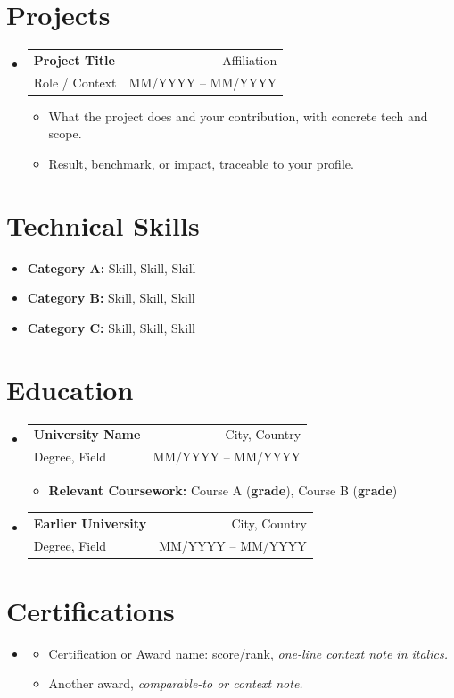 \documentclass[a4paper,10pt]{article}
\makeatletter
\newcommand{\cvitem}[1]{
  \item\small{
    {#1\vspace{-2pt}}
  }
}
\newcommand{\cvheading}[4]{
  \vspace{-2pt}\item
    \begin{tabular*}{\textwidth}[t]{l@{\extracolsep{\fill}}r}
      \textbf{#1} & #2 \\
      \small#3 & \small #4 \\
    \end{tabular*}\vspace{-6pt}
}
\newcommand{\cvheadingstart}{\begin{itemize}[leftmargin=0in, label={}]}
\newcommand{\cvheadingend}{\end{itemize}}
\newcommand{\cvitemstart}{\begin{itemize}\justifying}
\newcommand{\cvitemend}{\end{itemize}\vspace{-3pt}}
\makeatother
\begin{document}
\section{Projects}
\cvheadingstart
  \cvheading
    {Project Title}{Affiliation}
    {Role / Context}{MM/YYYY -- MM/YYYY}
  \cvitemstart
    \cvitem{What the project does and your contribution, with concrete tech and scope.}
    \cvitem{Result, benchmark, or impact, traceable to your profile.}
  \cvitemend
\cvheadingend

\section{Technical Skills}
    \cvitemstart
        \cvitem{{\bfseries Category A:} Skill, Skill, Skill}
        \cvitem{{\bfseries Category B:} Skill, Skill, Skill}
        \cvitem{{\bfseries Category C:} Skill, Skill, Skill}
    \cvitemend
\vspace{-5pt}

\section{Education}
\cvheadingstart
  \cvheading
    {University Name}{City, Country}
    {Degree, Field}{MM/YYYY -- MM/YYYY}
        \cvitemstart
        \cvitem{{\bfseries Relevant Coursework:}  Course A (\textbf{grade}), Course B (\textbf{grade})}
    \cvitemend
  \cvheading
    {Earlier University}{City, Country}
    {Degree, Field}{MM/YYYY -- MM/YYYY}
\cvheadingend

\section{Certifications}
\cvheadingstart
\item
\cvitemstart
  \cvitem{Certification or Award name: score/rank, \textit{one-line context note in italics.}}
  \cvitem{Another award, \textit{comparable-to or context note.}}
\cvitemend
\cvheadingend
\end{document}
